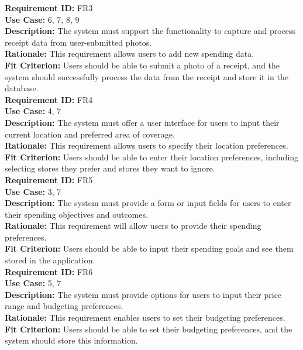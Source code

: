 \documentclass[12pt]{article}
\begin{document}
\medskip
\noindent \textbf{Requirement ID:} FR3\\
\textbf{Use Case:} 6, 7, 8, 9\\
\textbf{Description:} The system must support the functionality to capture and process receipt data from user-submitted photos.\\
\textbf{Rationale:} This requirement allows users to add new spending data.\\
\textbf{Fit Criterion:} Users should be able to submit a photo of a receipt, and the system should successfully process the data from the receipt and store it in the database.\\

\medskip
\noindent \textbf{Requirement ID:} FR4\\
\textbf{Use Case:} 4, 7\\
\textbf{Description:} The system must offer a user interface for users to input their current location and preferred area of coverage.\\
\textbf{Rationale:} This requirement allows users to specify their location preferences.\\
\textbf{Fit Criterion:} Users should be able to enter their location preferences, including selecting stores they prefer and stores they want to ignore.\\

\medskip
\noindent \textbf{Requirement ID:} FR5\\
\textbf{Use Case:} 3, 7\\
\textbf{Description:} The system must provide a form or input fields for users to enter their spending objectives and outcomes.\\
\textbf{Rationale:} This requirement will allow users to provide their spending preferences.\\
\textbf{Fit Criterion:} Users should be able to input their spending goals and see them stored in the application.\\

\medskip
\noindent \textbf{Requirement ID:} FR6\\
\textbf{Use Case:} 5, 7\\
\textbf{Description:} The system must provide options for users to input their price range and budgeting preferences.\\
\textbf{Rationale:} This requirement enables users to set their budgeting preferences.\\
\textbf{Fit Criterion:} Users should be able to set their budgeting preferences, and the system should store this information.\\
\end{document}
